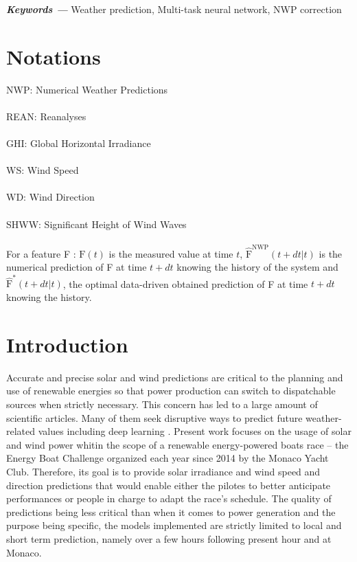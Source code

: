 \documentclass{article}
\providecommand{\keywords}[1]{\textbf{\textit{Keywords ---}} #1}
\begin{document}
\vspace{20px}

\keywords{Weather prediction, Multi-task neural network, NWP correction}

\section*{Notations}

NWP: Numerical Weather Predictions\\
\\
REAN: Reanalyses\\
\\
GHI: Global Horizontal Irradiance\\
\\
WS: Wind Speed\\
\\
WD: Wind Direction\\
\\
SHWW: Significant Height of Wind Waves\\
\\
For a feature F : $\mathrm F (t)$ is the measured value at time $t$, $\hat{\mathrm F}^\mathrm{NWP} (t + dt | t)$ is
the numerical prediction of F at time $t + dt$ knowing the history of the system
and $\hat{\mathrm F}^* (t + dt | t)$, the optimal data-driven obtained prediction of F at time $t + dt$ knowing the history.

\section{Introduction}

Accurate and precise solar and wind predictions are critical to the planning and use of renewable energies so that
power production can switch to dispatchable sources when strictly necessary. This concern has led to a large amount of
scientific articles. Many of them seek disruptive ways to predict future weather-related values including deep learning
\cite{zhong_multi-view_2021}.
Present work focuses on the usage of solar and wind power whitin the scope of a renewable energy-powered boats race
-- the Energy Boat Challenge organized each year since 2014 by the Monaco Yacht Club. Therefore, its goal is to provide
solar irradiance and wind speed and direction predictions that would enable either the pilotes to better anticipate
performances or people in charge to adapt the race's schedule. The quality of predictions being less critical than
when it comes to power generation and the purpose being specific, the models implemented are strictly limited to
local and short term prediction, namely over a few hours following present hour and at Monaco.
\end{document}
